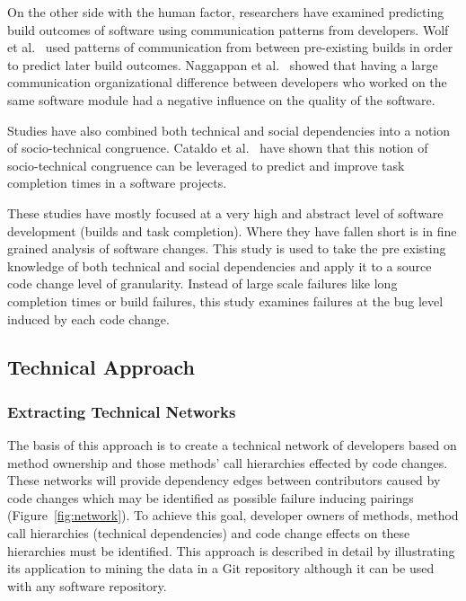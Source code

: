 On the other side with the human factor, researchers have examined predicting build outcomes of software
using communication patterns from developers. Wolf et al.~\cite{5070503} used patterns of communication from between
pre-existing builds in order to predict later build outcomes. Naggappan et al.~\cite{nagappan08} showed that having a large
communication organizational difference between developers who worked on the same software module had
a negative influence on the quality of the software.

Studies have also combined both technical and social dependencies into a notion of socio-technical congruence.
Cataldo et al.~\cite{Cataldo:2006:ICR} have shown that this notion of socio-technical congruence can be leveraged to predict
and improve task completion times in a software projects.

These studies have mostly focused at a very high and abstract level of software development (builds and task completion).
Where they have fallen short is in fine grained analysis of software changes. This study is used to take the
pre existing knowledge of both technical and social dependencies and apply it to a source code change level of
granularity. Instead of large scale failures like long completion times or build failures, this study examines failures
at the bug level induced by each code change.


\subsection{Technical Approach}

\subsubsection{Extracting Technical Networks}
The basis of this approach is to create a technical network of developers based on method ownership
and those methods' call hierarchies effected by code changes. These networks will provide
dependency edges between contributors caused by code changes which may be 
identified as possible failure inducing pairings (Figure~\ref{fig:network}). To achieve this goal,
developer owners of methods, method call hierarchies (technical
dependencies) and code change effects on these hierarchies must be identified.
This approach is described in detail by illustrating its application to mining the data in a Git
repository although it can be used with any software repository.

